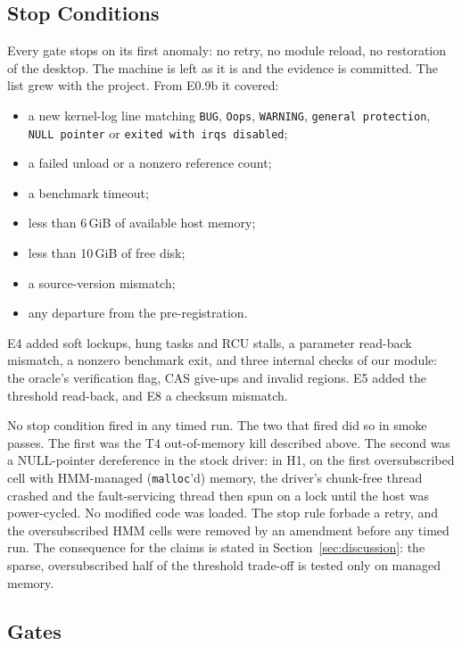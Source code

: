 \subsection{Stop Conditions}
\label{sec:protocol:stops}

Every gate stops on its first anomaly: no retry, no module reload, no
restoration of the desktop. The machine is left as it is and the
evidence is committed. The list grew with the project. From E0.9b it
covered:
\begin{itemize}
\item a new kernel-log line matching \texttt{BUG}, \texttt{Oops},
  \texttt{WARNING}, \texttt{general protection}, \texttt{NULL pointer}
  or \texttt{exited with irqs disabled};
\item a failed unload or a nonzero reference count;
\item a benchmark timeout;
\item less than 6\,GiB of available host memory;
\item less than 10\,GiB of free disk;
\item a source-version mismatch;
\item any departure from the pre-registration.
\end{itemize}
E4 added soft lockups, hung tasks and RCU stalls, a parameter read-back
mismatch, a nonzero benchmark exit, and three internal checks of our
module: the oracle's verification flag, CAS give-ups and invalid
regions. E5 added the threshold read-back, and E8 a checksum mismatch.

No stop condition fired in any timed run. The two that fired did so in
smoke passes. The first was the T4 out-of-memory kill described above.
The second was a NULL-pointer dereference in the stock driver: in H1,
on the first oversubscribed cell with HMM-managed (\texttt{malloc}'d)
memory, the driver's chunk-free thread crashed and the fault-servicing
thread then spun on a lock until the host was power-cycled. No modified
code was loaded. The stop rule forbade a retry, and the oversubscribed
HMM cells were removed by an amendment before any timed run. The
consequence for the claims is stated in Section~\ref{sec:discussion}:
the sparse, oversubscribed half of the threshold trade-off is tested
only on managed memory.

\subsection{Gates}
\label{sec:protocol:gates}

